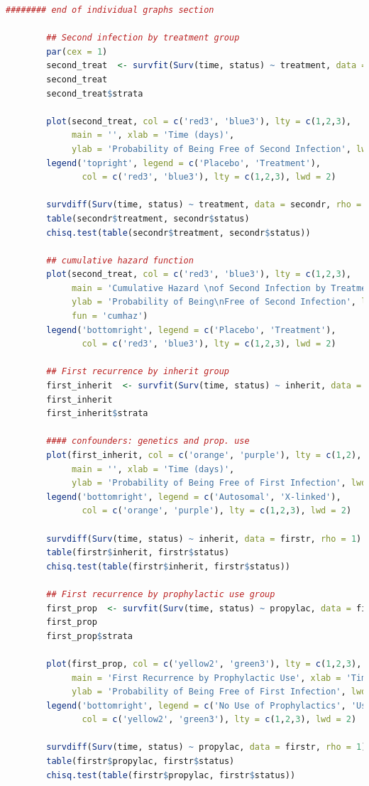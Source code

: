 \documentclass{article}
\begin{document}
\begin{lstlisting}[language=R, basicstyle=\ttfamily\footnotesize, breaklines=true]
		######## end of individual graphs section
		
		## Second infection by treatment group 
		par(cex = 1)
		second_treat  <- survfit(Surv(time, status) ~ treatment, data = secondr)
		second_treat 
		second_treat$strata
		
		plot(second_treat, col = c('red3', 'blue3'), lty = c(1,2,3), 
			 main = '', xlab = 'Time (days)',
			 ylab = 'Probability of Being Free of Second Infection', lwd = 2)
		legend('topright', legend = c('Placebo', 'Treatment'), 
			   col = c('red3', 'blue3'), lty = c(1,2,3), lwd = 2)
		
		survdiff(Surv(time, status) ~ treatment, data = secondr, rho = 1)
		table(secondr$treatment, secondr$status)
		chisq.test(table(secondr$treatment, secondr$status))
		
		## cumulative hazard function
		plot(second_treat, col = c('red3', 'blue3'), lty = c(1,2,3), 
			 main = 'Cumulative Hazard \nof Second Infection by Treatment', xlab = 'Time (days)',
			 ylab = 'Probability of Being\nFree of Second Infection', lwd = 2,
			 fun = 'cumhaz')
		legend('bottomright', legend = c('Placebo', 'Treatment'), 
			   col = c('red3', 'blue3'), lty = c(1,2,3), lwd = 2)
		
		## First recurrence by inherit group 
		first_inherit  <- survfit(Surv(time, status) ~ inherit, data = firstr)
		first_inherit 
		first_inherit$strata
		
		#### confounders: genetics and prop. use
		plot(first_inherit, col = c('orange', 'purple'), lty = c(1,2), 
			 main = '', xlab = 'Time (days)',
			 ylab = 'Probability of Being Free of First Infection', lwd = 2)
		legend('bottomright', legend = c('Autosomal', 'X-linked'), 
			   col = c('orange', 'purple'), lty = c(1,2,3), lwd = 2)
		
		survdiff(Surv(time, status) ~ inherit, data = firstr, rho = 1)
		table(firstr$inherit, firstr$status)
		chisq.test(table(firstr$inherit, firstr$status))
		
		## First recurrence by prophylactic use group 
		first_prop  <- survfit(Surv(time, status) ~ propylac, data = firstr)
		first_prop
		first_prop$strata
		
		plot(first_prop, col = c('yellow2', 'green3'), lty = c(1,2,3), 
			 main = 'First Recurrence by Prophylactic Use', xlab = 'Time (days)',
			 ylab = 'Probability of Being Free of First Infection', lwd = 2)
		legend('bottomright', legend = c('No Use of Prophylactics', 'Usage of Prophylactics'), 
			   col = c('yellow2', 'green3'), lty = c(1,2,3), lwd = 2)
		
		survdiff(Surv(time, status) ~ propylac, data = firstr, rho = 1)
		table(firstr$propylac, firstr$status)
		chisq.test(table(firstr$propylac, firstr$status))
		\end{lstlisting}
		




		
\end{document}
